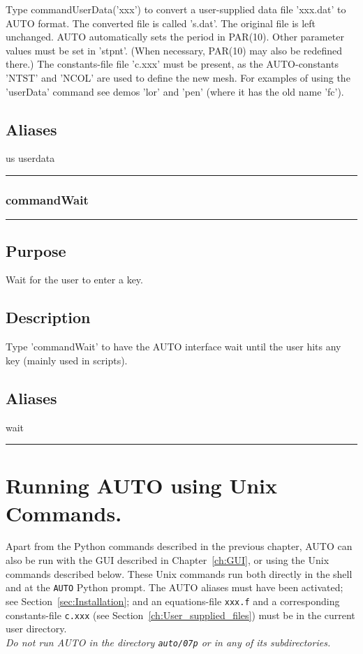 \documentclass[12pt]{report}
\begin{document}
\begin{minipage}{6in}
    Type commandUserData('xxx') to convert a user-supplied data file 'xxx.dat' to
    AUTO format. The converted file is called 's.dat'.  The original
    file is left unchanged.  AUTO automatically sets the period in
    PAR(10).  Other parameter values must be set in 'stpnt'. (When
    necessary, PAR(10) may also be redefined there.)  The
    constants-file file 'c.xxx' must be present, as the AUTO-constants
    'NTST' and 'NCOL' are used to define the new mesh.  For examples
    of using the 'userData' command see demos 'lor' and 'pen' (where
    it has the old name 'fc').
    \section*{Aliases}
us userdata \medskip\hrule\end{minipage}\subsection{commandWait} \label{sec:clui_ref_commandWait}\begin{minipage}{6in}\hrule\medskip\section*{Purpose}
Wait for the user to enter a key.\section*{Description}

    Type 'commandWait' to have the AUTO interface wait
    until the user hits any key (mainly used in scripts).
    \section*{Aliases}
wait \medskip\hrule\end{minipage}

\chapter{ Running {\cal AUTO} using Unix Commands.} \label{sec:command_mode}
Apart from the Python commands described in the previous chapter,
{\cal AUTO} can also be run with the GUI described in Chapter~\ref{ch:GUI},
or using the Unix commands described below. These Unix commands run both
directly in the shell and at the {\tt AUTO} Python prompt.
The {\cal AUTO} aliases must have been activated; see Section~\ref{sec:Installation}; 
and an equations-file {\tt xxx.f} 
and a corresponding constants-file {\tt c.xxx} 
(see Section~\ref{ch:User_supplied_files})
must be in the current user directory.
\\
{\it Do not run {\cal AUTO} in the directory {\tt auto/07p} 
or in any of its subdirectories.}
\end{document}
